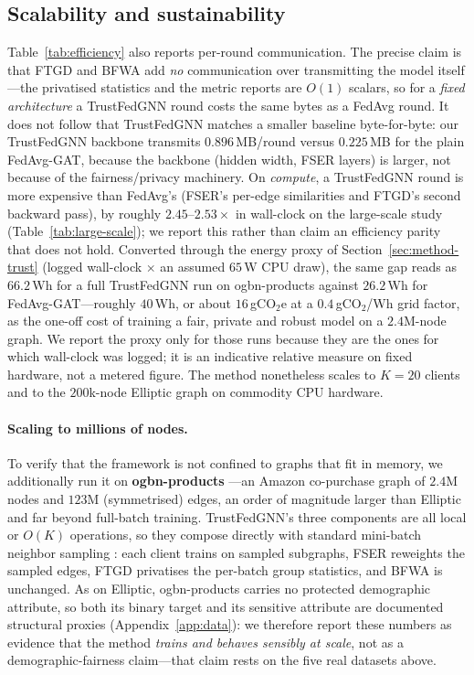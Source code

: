 \documentclass[pdflatex,sn-mathphys-num]{sn-jnl}
\theoremstyle{thmstyleone}%
\theoremstyle{thmstyletwo}%
\theoremstyle{thmstylethree}%
\begin{document}
\subsection{Scalability and sustainability}
Table~\ref{tab:efficiency} also reports per-round communication. The precise
claim is that FTGD and BFWA add \emph{no} communication over transmitting the
model itself---the privatised statistics and the metric reports are $O(1)$
scalars, so for a \emph{fixed architecture} a TrustFedGNN round costs the same
bytes as a FedAvg round. It does not follow that TrustFedGNN matches a smaller
baseline byte-for-byte: our TrustFedGNN backbone transmits $0.896$\,MB/round
versus $0.225$\,MB for the plain FedAvg-GAT, because the backbone (hidden width,
FSER layers) is larger, not because of the fairness/privacy machinery. On
\emph{compute}, a TrustFedGNN round is more expensive than FedAvg's (FSER's
per-edge similarities and FTGD's second backward pass), by roughly
$2.45$--$2.53\times$ in wall-clock on the large-scale study
(Table~\ref{tab:large-scale}); we report this rather than claim an efficiency
parity that does not hold. Converted through the energy proxy of
Section~\ref{sec:method-trust} (logged wall-clock $\times$ an assumed $65$\,W CPU
draw), the same gap reads as $66.2$\,Wh for a full TrustFedGNN run on
ogbn-products against $26.2$\,Wh for FedAvg-GAT---roughly $40$\,Wh, or about
$16$\,gCO$_2$e at a $0.4$\,gCO$_2$/Wh grid factor, as the one-off cost of
training a fair, private and robust model on a $2.4$M-node graph. We report the
proxy only for those runs because they are the ones for which wall-clock was
logged; it is an indicative relative measure on fixed hardware, not a metered
figure. The method nonetheless scales to $K{=}20$ clients and
to the $200$k-node Elliptic graph on commodity CPU hardware.

\paragraph{Scaling to millions of nodes.}
\label{sec:scaling}
To verify that the framework is not confined to graphs that fit in memory, we
additionally run it on \textbf{ogbn-products} \cite{hu2020ogb}---an Amazon
co-purchase graph of $2.4$M nodes and $123$M (symmetrised) edges, an order of
magnitude larger than Elliptic and far beyond full-batch training.
TrustFedGNN's three components are all local or $O(K)$ operations, so they
compose directly with standard mini-batch neighbor sampling
\cite{hamilton2017graphsage}: each client trains on sampled subgraphs, FSER
reweights the sampled edges, FTGD privatises the per-batch group statistics,
and BFWA is unchanged. As on Elliptic, ogbn-products carries no protected
demographic attribute, so both its binary target and its sensitive attribute
are documented structural proxies (Appendix~\ref{app:data}): we therefore
report these numbers as evidence that the method \emph{trains and behaves
sensibly at scale}, not as a demographic-fairness claim---that claim rests on
the five real datasets above.
\end{document}
